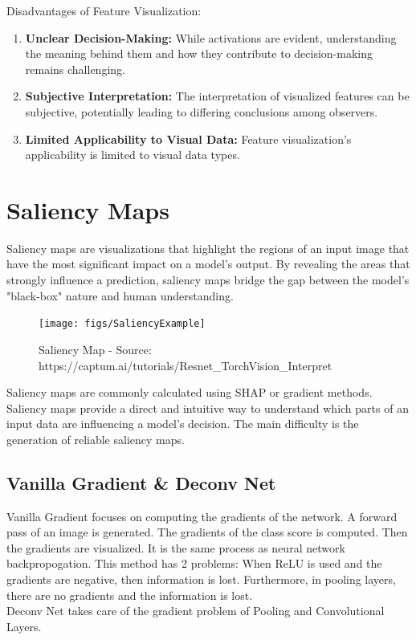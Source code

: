 Disadvantages of Feature Visualization:
\begin{enumerate}
	\item \textbf{Unclear Decision-Making:} While activations are evident, understanding the meaning behind them and how they contribute to decision-making remains challenging.
	\item \textbf{Subjective Interpretation:} The interpretation of visualized features can be subjective, potentially leading to differing conclusions among observers.
	\item \textbf{Limited Applicability to Visual Data:} Feature visualization's applicability is  limited to visual data types.
\end{enumerate}


\section{Saliency Maps}

Saliency maps are visualizations that highlight the regions of an input image that have the most significant impact on a model's output. By revealing the areas that strongly influence a prediction, saliency maps bridge the gap between the model's "black-box" nature and human understanding.

\begin{figure}[h!]
	\centering
	\texttt{[image: figs/SaliencyExample]}
	\caption{Saliency Map - Source: https://captum.ai/tutorials/Resnet\_TorchVision\_Interpret}
	\label{fig:saliency}
\end{figure}

Saliency maps are commonly calculated using SHAP \cite{lundberg2017unified} or gradient methods. Saliency maps provide a direct and intuitive way to understand which parts of an input data are influencing a model's decision. The main difficulty is the generation of reliable saliency maps.


\subsection{Vanilla Gradient \& Deconv Net}
\label{IG}


Vanilla Gradient\cite{simonyan2014deep} focuses on computing the gradients of the network. A forward pass of an image is generated. The gradients of the class score is computed. Then the gradients are visualized. It is the same process as neural network backpropogation.
This method has 2 problems: When ReLU is used and the gradients are negative, then information is lost. Furthermore, in pooling layers, there are no gradients and the information is lost. 
\\
Deconv Net \cite{zeiler2013visualizing} takes care of the gradient problem of Pooling and Convolutional Layers. 


